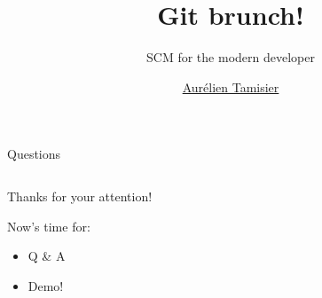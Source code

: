 \documentclass{beamer}
\title{Git brunch!}
\subtitle{SCM for the modern developer}
\author{\href{mailto://virtualtam@flibidi.net}{Aurélien Tamisier}}
\institute{The Internet}
\begin{document}
\frame{\titlepage}







\begin{frame}{Questions}
  \begin{columns}[t]
    \begin{column}{0.4\textwidth}
      Thanks for your attention!

      Now's time for:
      \begin{itemize}
      \item Q \& A
      \item Demo!
      \end{itemize}
    \end{column}
    \iftoggle{GOODIES}{
      \begin{column}{0.6\textwidth}
        \begin{center}
          \texttt{[image: img/gitgrumpy.jpg]}
        \end{center}
      \end{column}
    }{}
  \end{columns}
\end{frame}

%
\end{document}
